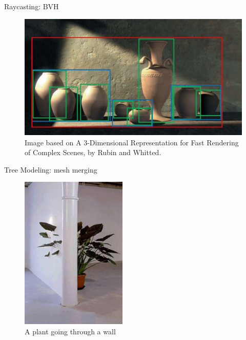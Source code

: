 \documentclass[10pt]{beamer}
\begin{document}
\begin{frame}{Raycasting: BVH}
	\begin{figure}
		\centering
		\includegraphics[width=\textwidth]{images/whitted_rubin_bvh.jpg}
		\caption{Image based on A 3-Dimensional Representation for Fast Rendering of Complex Scenes, by Rubin and Whitted. \cite{how-to-bvh}}
		\label{fig:figure1}
	\end{figure}
\end{frame}

\begin{frame}{Tree Modeling: mesh merging}
	\begin{figure}
		\centering
		\includegraphics[width=0.45\textwidth]{images/plants_wall.jpg}
		\caption{A plant going through a wall}
		\label{fig:figure1}
	\end{figure}
\end{frame}
\end{document}
